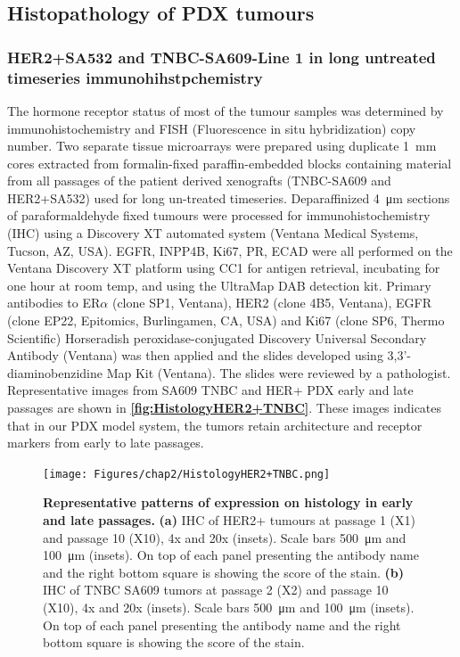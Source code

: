 \subsection{Histopathology of PDX tumours}

\subsubsection{HER2+SA532 and TNBC-SA609-Line 1 in long untreated timeseries immunohihstpchemistry}
The hormone receptor status of most of the tumour samples was determined by immunohistochemistry and FISH (Fluorescence in situ hybridization) copy number.
Two separate tissue microarrays were prepared using duplicate \SI{1}{\mm} cores extracted from formalin-fixed paraffin-embedded blocks containing material from all passages of the patient derived xenografts (TNBC-SA609 and HER2+SA532) used for long un-treated timeseries. 
Deparaffinized \SI{4}{\um} sections of paraformaldehyde fixed tumours were processed for immunohistochemistry (IHC) using a Discovery XT automated system (Ventana Medical Systems, Tucson, AZ, USA). 
EGFR, INPP4B, Ki67, PR, ECAD were all performed on the Ventana Discovery XT platform using CC1 for antigen retrieval, incubating for one hour at room temp, and using the UltraMap DAB detection kit.
Primary antibodies to ER$\alpha$ (clone SP1, Ventana), HER2 (clone 4B5, Ventana), EGFR (clone EP22, Epitomics, Burlingamen, CA, USA) and Ki67 (clone SP6, Thermo Scientific) 
Horseradish peroxidase-conjugated Discovery Universal Secondary Antibody (Ventana) was then applied and the slides developed using 3,3'-diaminobenzidine Map Kit (Ventana). 
The slides were reviewed by a pathologist. Representative images from SA609 TNBC and HER+ PDX early and late passages are shown in \textbf{\autoref{fig:HistologyHER2+TNBC}}. These images indicates that in our PDX model system, the tumors retain architecture and receptor markers from early to late passages.

 \begin{figure}
\centering
\texttt{[image: Figures/chap2/HistologyHER2+TNBC.png]}
	
\caption[Representative patterns of expression on histology in early and late passages]
	{\small
\textbf{Representative patterns of expression on histology in early and late passages.}
 \textbf{(a)} IHC of HER2+ tumours at passage 1 (X1) and passage 10 (X10), 4x and 20x (insets). Scale bars \SI{500}{\micro\metre} and \SI{100}{\micro\metre} (insets). On top of each panel presenting the antibody name and the right bottom square is showing the score of the stain.
\textbf{(b)} IHC of TNBC SA609 tumors at passage 2 (X2) and passage 10 (X10), 4x and 20x (insets). Scale bars \SI{500}{\micro\metre} and \SI{100}{\micro\metre} (insets). On top of each panel presenting the antibody name and the right bottom square is showing the score of the stain.}
	\label{fig:HistologyHER2+TNBC}
\end{figure}


